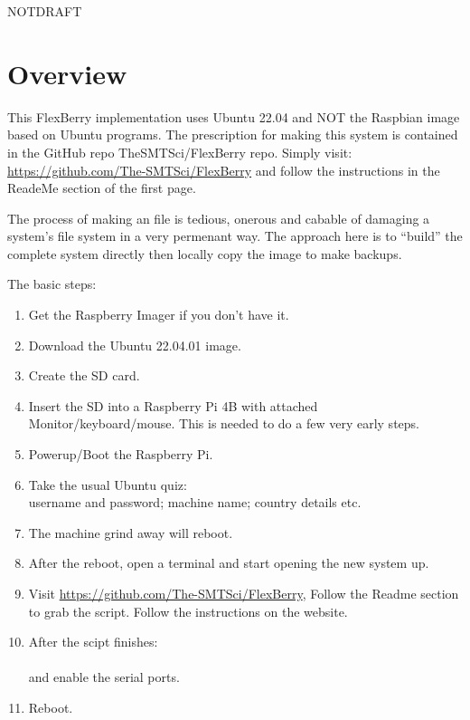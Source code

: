 \documentclass[letter,11pt,oneside]{article}
\def\documentisdraft{NOTDRAFT}
\newcommand{\dhl}[1]{{\color{verbcolor}{\texttt#1}}}
\begin{document}
\clearpage
{}   %
\tableofcontents
\listoffigures
\listoftables
\newpage


\setcounter{section}{1}

\ifx\documentisdraft\drafttest
\linenumbers    %
\fi
{}

\section*{Overview}
\setcounter{page}{1}

This FlexBerry implementation uses Ubuntu 22.04 and NOT the Raspbian
image based on Ubuntu programs. The prescription for making this
system is contained in the GitHub repo TheSMTSci/FlexBerry repo.
Simply visit: \url{https://github.com/The-SMTSci/FlexBerry} and
follow the instructions in the ReadeMe section of the first
page.

The process of making an \dhl{iso} file is tedious, onerous and cabable
of damaging a system's file system in a very permenant way. The approach
here is to ``build'' the complete system directly then locally copy the image
to make backups.


The basic steps:
\vspace{-.15cm}
\begin{enumerate}\addtolength{\itemsep}{-0.5\baselineskip}
   \item   Get the Raspberry Imager if you don't have it.
   \item   Download the Ubuntu 22.04.01 image.
   \item   Create the SD card.
   \item   Insert the SD into a Raspberry Pi 4B with attached Monitor/keyboard/mouse.
  This is needed to do a few very early steps.
   \item   Powerup/Boot the Raspberry Pi.
   \item   Take the usual Ubuntu quiz:\\
        username and password; machine name; country details etc.
   \item   The machine grind away will reboot.
   \item   After the reboot, open a terminal and start opening the new system up.
   \item   Visit \url{https://github.com/The-SMTSci/FlexBerry}, Follow the Readme
section to grab the \dhl{RPi/FollowMe.sh} script. Follow the instructions on the website.
   \item   After the scipt finishes: \\
     \dhl{sudo raspi-config}\\
and enable the serial ports.
   \item Reboot.
\end{enumerate}
\end{document}
